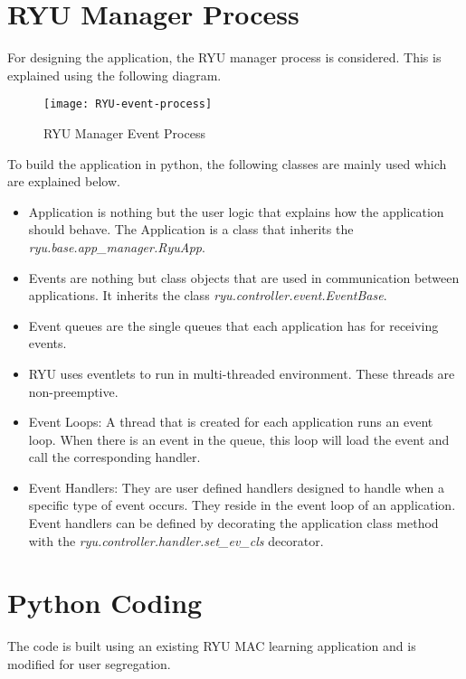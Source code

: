 \section{RYU Manager Process \cite{RYU_app_process}} \label{RYU_Manager_Process}
 For designing the application, the RYU manager process is considered. This is explained using the following diagram.
 \begin{figure}[H]
 	\centering
 	\texttt{[image: RYU-event-process]}
 	\caption {RYU Manager Event Process \cite{RYU_event_process_diag}}
 	\label{fig:RYU-Event-Process}
 	\vspace{-10pt}
 \end{figure}
To build the application in python, the following classes are mainly used which are explained below.
\begin{itemize}
	\item Application is nothing but the user logic that explains how the application should behave. The Application is a class that inherits the \textit{ryu.base.app\_manager.RyuApp}.
	\item Events are nothing but class objects that are used in communication between applications. It inherits the class \textit{ryu.controller.event.EventBase}.
	\item Event queues are the single queues that each application has for receiving events.
	\item RYU uses eventlets to run in multi-threaded environment. These threads are non-preemptive.
	\item Event Loops: A thread that is created for each application runs an event loop. When there is an event in the queue, this loop will load the event and call the corresponding handler.
	\item Event Handlers:  They are user defined handlers designed to handle when a specific type of event occurs. They reside in the event loop of an application. Event handlers can be defined by decorating the application class method with the \textit{ryu.controller.handler.set\_ev\_cls} decorator.
	
\end{itemize}

\section{Python Coding}\label{Python_code}
The code is built using an existing RYU MAC learning application and is modified for user segregation.

